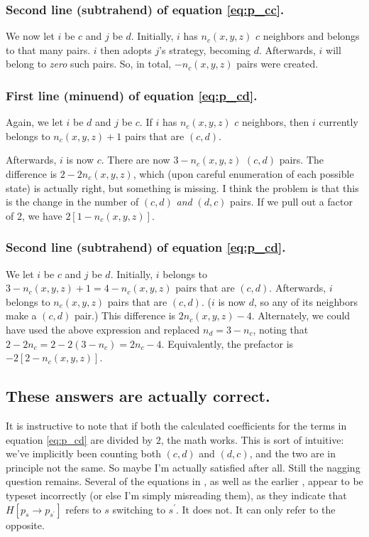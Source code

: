\documentclass[13pt]{amsart}
\begin{document}
\subsubsection*{Second line (subtrahend) of equation \ref{eq:p_cc}.}
We now let $i$ be $c$ and $j$ be $d$.
Initially, $i$ has $n_c(x,y,z)$ $c$ neighbors and belongs to that many pairs.
$i$ then adopts $j$'s strategy, becoming $d$.
Afterwards, $i$ will belong to \emph{zero} such pairs.
So, in total, $-n_c(x,y,z)$ pairs were created.

\subsubsection*{First line (minuend) of equation \ref{eq:p_cd}.}

Again, we let $i$ be $d$ and $j$ be $c$.
If $i$ has $n_c(x,y,z)$ $c$ neighbors, then $i$ currently belongs to $n_c(x,y,z) + 1$ pairs that are $(c,d)$.

Afterwards, $i$ is now $c$.
There are now $3 - n_c(x,y,z)$ $(c,d)$ pairs.
The difference is $2 - 2n_c(x,y,z)$, which (upon careful enumeration of each possible state) is actually right, but something is missing.
I think the problem is that this is the change in the number of $(c,d)$ \emph{and} $(d,c)$ pairs.
If we pull out a factor of $2$, we have $2 \left[ 1 - n_c(x,y,z) \right]$.

\subsubsection*{Second line (subtrahend) of equation \ref{eq:p_cd}.}

We let $i$ be $c$ and $j$ be $d$.
Initially, $i$ belongs to $3 - n_c(x,y,z) + 1 = 4 - n_c(x,y,z)$ pairs that are $(c,d)$.
Afterwards, $i$ belongs to $n_c(x,y,z)$ pairs that are $(c,d)$.
($i$ is now $d$, so any of its neighbors make a $(c,d)$ pair.)
This difference is $2n_c(x,y,z) - 4$.
Alternately, we could have used the above expression and replaced $n_d = 3 - n_c$, noting that $2 - 2n_c = 2 - 2(3 - n_c) = 2n_c - 4$.
Equivalently, the prefactor is $- 2\left[ 2 - n_c(x,y,z)\right]$.

\subsection*{These answers are actually correct.}
It is instructive to note that if both the calculated coefficients for the terms in equation \ref{eq:p_cd} are divided by $2$, the math works.
This is sort of intuitive: we've implicitly been counting both $(c,d)$ and $(d,c)$, and the two are in principle not the same.
So maybe I'm actually satisfied after all.
Still the nagging question remains.
Several of the equations in \citet{li.etal_2019}, as well as the earlier \citet{perc.marhl_2006}, appear to be typeset incorrectly (or else I'm simply misreading them), as they indicate that $H\left[ p_s \to p_{s^\prime} \right]$ refers to $s$ switching to $s^\prime$.
It does not.
It can only refer to the opposite.



\end{document}
